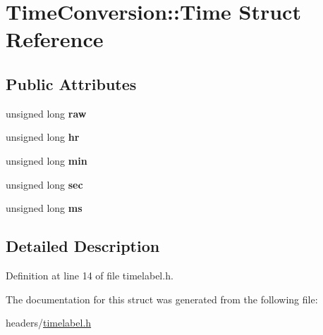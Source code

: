 \hypertarget{structTimeConversion_1_1Time}{}\section{Time\+Conversion\+:\+:Time Struct Reference}
\label{structTimeConversion_1_1Time}
\subsection*{Public Attributes}
\begin{DoxyCompactItemize}
\item 
\hypertarget{structTimeConversion_1_1Time_af994b4dfc68913059d4b9f1e87c06a99}{}unsigned long {\bfseries raw}\label{structTimeConversion_1_1Time_af994b4dfc68913059d4b9f1e87c06a99}

\item 
\hypertarget{structTimeConversion_1_1Time_a622a32fbf330e9b9b8c71cba88b564f5}{}unsigned long {\bfseries hr}\label{structTimeConversion_1_1Time_a622a32fbf330e9b9b8c71cba88b564f5}

\item 
\hypertarget{structTimeConversion_1_1Time_acb711ae4dca8c51bffcc63e48e36a11d}{}unsigned long {\bfseries min}\label{structTimeConversion_1_1Time_acb711ae4dca8c51bffcc63e48e36a11d}

\item 
\hypertarget{structTimeConversion_1_1Time_a93153aa67ed078df258310b6b52804ae}{}unsigned long {\bfseries sec}\label{structTimeConversion_1_1Time_a93153aa67ed078df258310b6b52804ae}

\item 
\hypertarget{structTimeConversion_1_1Time_a4837e0e893a0b8be137662e655b87995}{}unsigned long {\bfseries ms}\label{structTimeConversion_1_1Time_a4837e0e893a0b8be137662e655b87995}

\end{DoxyCompactItemize}


\subsection{Detailed Description}


Definition at line 14 of file timelabel.\+h.



The documentation for this struct was generated from the following file\+:\begin{DoxyCompactItemize}
\item 
headers/\hyperlink{timelabel_8h}{timelabel.\+h}\end{DoxyCompactItemize}

